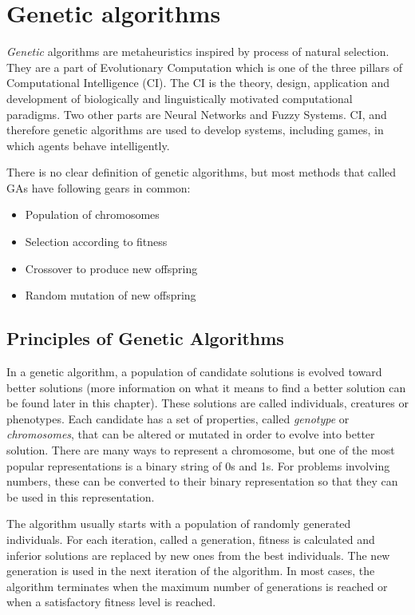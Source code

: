 \section{Genetic algorithms}
\emph{Genetic} algorithms are metaheuristics inspired by process of natural selection. They are a part of Evolutionary Computation which is one of the three pillars of Computational Intelligence (CI). The CI is the theory, design, application and development of biologically and linguistically motivated computational paradigms. \cite{what_is_ci}
Two other parts are Neural Networks and Fuzzy Systems. CI, and therefore genetic algorithms are used to develop systems, including games, in which agents behave intelligently.

There is no clear definition of genetic algorithms, but most methods that called GAs have following gears in common:
\begin{itemize}
    \item Population of chromosomes
    \item Selection according to fitness
    \item Crossover to produce new offspring
    \item Random mutation of new offspring
\end{itemize}

\subsection{Principles of Genetic Algorithms}
In a genetic algorithm, a population of candidate solutions is evolved toward better solutions (more information on what it means to find a better solution can be found later in this chapter). These solutions are called individuals, creatures or phenotypes. Each candidate has a set of properties, called \emph{genotype} or \emph{chromosomes}, that can be altered or mutated in order to evolve into better solution. There are many ways to represent a chromosome, but one of the most popular representations is a binary string of 0s and 1s. For problems involving numbers, these can be converted to their binary representation so that they can be used in this representation.

The algorithm usually starts with a population of randomly generated individuals. For each iteration, called a generation, fitness is calculated and inferior solutions are replaced by new ones from the best individuals. The new generation is used in the next iteration of the algorithm. In most cases, the algorithm terminates when the maximum number of generations is reached or when a satisfactory fitness level is reached.

